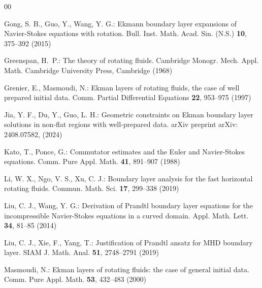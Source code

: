 \documentclass[pdflatex,sn-mathphys-num]{sn-jnl}%
\theoremstyle{thmstyleone}%
\theoremstyle{thmstyletwo}%
\theoremstyle{thmstylethree}%
\theoremstyle{thmstyletwo}
\begin{document}
\begin{thebibliography}{00}
	
	
	 Gong, S. B., Guo, Y.,  Wang,  Y. G.: Ekmann boundary layer expansions of Navier-Stokes equations with rotation. {Bull. Inst. Math. Acad. Sin. (N.S.)} {\bf 10}, 375--392  (2015) 
	
	

	
	
	Greenspan, H.~P.: The theory of rotating fluids.
	Cambridge Monogr. Mech. Appl. Math.
	Cambridge University Press, Cambridge (1968) 
	
	

	
	Grenier, E., Masmoudi, N.: Ekman layers of rotating fluids, the case of well prepared initial data.
	Comm. Partial Differential Equations \textbf{22}, 953--975 (1997)
	

	
%	
	Jia, Y. F., Du, Y., Guo, L. H.: Geometric constraints on Ekman boundary layer solutions in non-flat regions with well-prepared data.
	arXiv preprint arXiv: 2408.07582, (2024)
	


	
	Kato, T., Ponce, G.:  Commutator estimates and the Euler and Navier-Stokes equations.
	{Comm. Pure Appl. Math.} {\bf 41},  891--907 (1988)
	

	
	Li, W. X., Ngo, V. S., Xu, C. J.: Boundary layer analysis for the fast horizontal rotating fluids. {Commun. Math. Sci.} {\bf 17},  299--338  (2019)
	


	
	 Liu, C. J., Wang,  Y. G.: Derivation of Prandtl boundary layer equations for the incompressible Navier-Stokes equations in a curved domain. { Appl. Math. Lett.} {\bf 34},  81--85  (2014)
	

	
	
	Liu, C. J.,  Xie, F.,  Yang, T.: Justification of Prandtl ansatz for MHD boundary layer. {SIAM J. Math. Anal.} {\bf 51},   2748--2791  (2019)
	
	
	
	Masmoudi, N.: Ekman layers of rotating fluids: {the} case of general initial data.
	Comm. Pure Appl. Math. \textbf{53}, 432--483 (2000)
	


\end{thebibliography}
\end{document}
